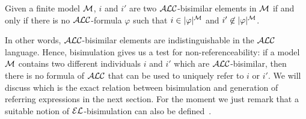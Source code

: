\begin{theorem}\label{bisim}
Given a finite model $\mathcal{M}$, $i$ and $i'$ are two $\mathcal{ALC}$-bisimilar elements in $\mathcal{M}$
if and only if there is no $\mathcal{ALC}$-formula $\varphi$ such that $i \in |\varphi|^{\mathcal{M}}$ and
$i' \not \in |\varphi|^{\mathcal{M}}$.
\end{theorem}

In other words, $\mathcal{ALC}$-bisimilar elements are indistinguishable in the $\mathcal{ALC}$ language. Hence, bisimulation gives us a test for non-referenceability: if a
model $\mathcal{M}$ contains two different individuals $i$ and $i'$ which are
$\mathcal{ALC}$-bisimilar, then there is no formula of $\mathcal{ALC}$ that can be used to uniquely
refer to $i$ or $i'$.  We will discuss which is the exact relation between
bisimulation and generation of referring expressions in the next section.
For the moment we just remark that a suitable notion of $\mathcal{EL}$-bisimulation can also be defined~\cite{kurt:expr99}.

